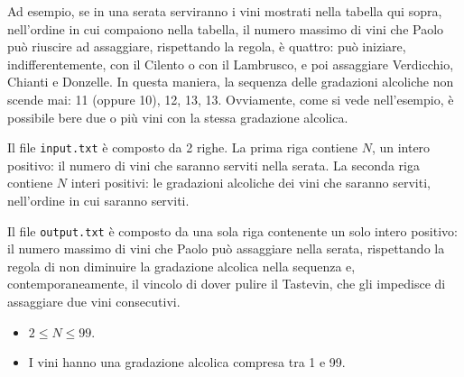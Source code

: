 Ad esempio, se in una serata serviranno i vini mostrati nella tabella
qui sopra, nell’ordine in cui compaiono nella tabella, il numero
massimo di vini che Paolo può riuscire ad assaggiare, rispettando la
regola, è quattro: può iniziare, indifferentemente, con il Cilento o
con il Lambrusco, e poi assaggiare Verdicchio, Chianti e Donzelle. In
questa maniera, la sequenza delle gradazioni alcoliche non scende mai:
11 (oppure 10), 12, 13, 13. Ovviamente, come si vede nell’esempio, è
possibile bere due o più vini con la stessa gradazione alcolica.

Il file \verb'input.txt' è composto da 2 righe. La prima riga contiene
$N$, un intero positivo: il numero di vini che saranno serviti nella
serata. La seconda riga contiene $N$ interi positivi: le gradazioni
alcoliche dei vini che saranno serviti, nell’ordine in cui saranno
serviti.

Il file \verb'output.txt' è composto da una sola riga contenente un
solo intero positivo: il numero massimo di vini che Paolo può
assaggiare nella serata, rispettando la regola di non diminuire la
gradazione alcolica nella sequenza e, contemporaneamente, il vincolo
di dover pulire il Tastevin, che gli impedisce di assaggiare due vini
consecutivi.

\begin{itemize}[nolistsep, noitemsep]
\item $2 \le N \le 99$.
\item I vini hanno una gradazione alcolica compresa tra 1 e 99.
\end{itemize}



